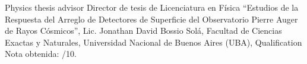 \ifeng
Physics thesis advisor
 \else
Director de tesis de Licenciatura en Física
 \fi
``Estudios de la Respuesta del Arreglo de Detectores de Superficie del Observatorio Pierre Auger de Rayos Cósmicos'', Lic. Jonathan David Bossio Solá, \at Facultad de Ciencias Exactas y Naturales, Universidad Nacional de Buenos Aires (UBA), \ifeng Qualification \else Nota obtenida: /10.



